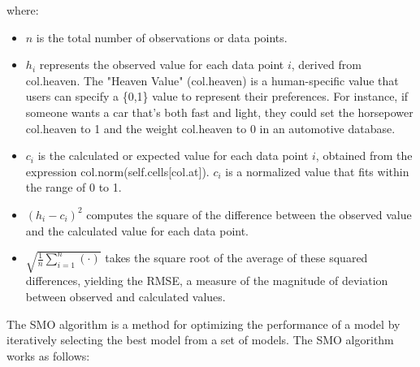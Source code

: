 \documentclass{ieeeaccess}
\begin{document}
where:
\begin{itemize}
    \item $n$ is the total number of observations or data points.
    \item $h_i$ represents the observed value for each data point $i$, derived from col.heaven. The "Heaven Value" (col.heaven) is a human-specific value that users can specify a \{0,1\} value to represent their preferences. For instance, if someone wants a car that's both fast and light, they could set the horsepower col.heaven to 1 and the weight col.heaven to 0 in an automotive database.
    \item $c_i$ is the calculated or expected value for each data point $i$, obtained from the expression col.norm(self.cells[col.at]). $c_i$ is a normalized value that fits within the range of 0 to 1.
    \item $(h_i - c_i)^2$ computes the square of the difference between the observed value and the calculated value for each data point.
    \item $\sqrt{\frac{1}{n} \sum_{i=1}^n (\cdot)}$ takes the square root of the average of these squared differences, yielding the RMSE, a measure of the magnitude of deviation between observed and calculated values.
\end{itemize}

The SMO algorithm is a method for optimizing the performance of a model by iteratively selecting the best model from a set of models. The SMO algorithm works as follows:
\end{document}
